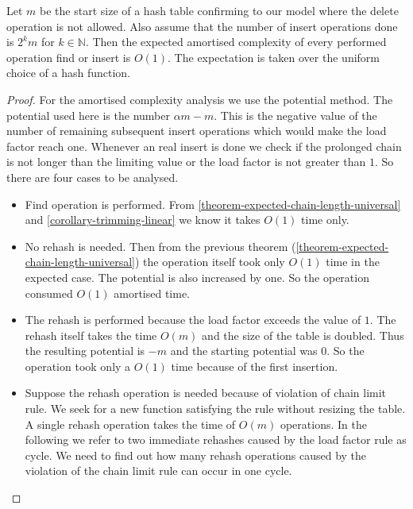 \begin{theorem}
Let $m$ be the start size of a hash table confirming to our model where the delete operation is not allowed.  Also assume that the number of insert operations done is $2^k m $ for $k \in \mathbb{N}$. Then the expected amortised complexity of every performed operation find or insert is $O(1)$. The expectation is taken over the uniform choice of a hash function. 
\end{theorem}
\begin{proof}
For the amortised complexity analysis we use the potential method. The potential used here is the number $\alpha m - m$. This is the negative value of the number of remaining subsequent insert operations which would make the load factor reach one. Whenever an real insert is done we check if the prolonged chain is not longer than the limiting value or the load factor is not greater than $1$. So there are four cases to be analysed.
\begin{itemize}
\item Find operation is performed. From \ref{theorem-expected-chain-length-universal} and \ref{corollary-trimming-linear} we know it takes $O(1)$ time only.

\item No rehash is needed. Then from the previous theorem (\ref{theorem-expected-chain-length-universal}) the operation itself took only $O(1)$ time in the expected case. The potential is also increased by one. So the operation consumed $O(1)$ amortised time.

\item The rehash is performed because the load factor exceeds the value of $1$. The rehash itself takes the time $O(m)$ and the size of the table is doubled. Thus the resulting potential is $-m$ and the starting potential was $0$. So the operation took only a $O(1)$ time because of the first insertion.

\item Suppose the rehash operation is needed because of violation of chain limit rule. We seek for a new function satisfying the rule without resizing the table. A single rehash operation takes the time of $O(m)$ operations. In the following we refer to two immediate rehashes caused by the load factor rule as cycle. We need to find out how many rehash operations caused by the violation of the chain limit rule can occur in one cycle. 


\end{itemize}
\end{proof}
